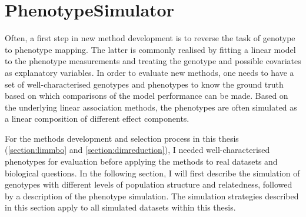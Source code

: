 \chapter{PhenotypeSimulator}
\label{chapter:simulation} 
Often, a first step in new method development is to reverse the task of genotype to phenotype mapping. The latter is commonly realised by fitting a linear model to the phenotype measurements and treating the genotype and possible covariates as explanatory variables. In order to evaluate new methods, one needs to have a set of well-characterised genotypes and phenotypes to know the ground truth based on which comparisons of the model performance can be made. Based on the underlying linear association methods, the phenotypes are often simulated as a linear composition of different effect components. 

For the methods development and selection process in this thesis (\cref{section:limmbo} and \cref{section:dimreduction}), I needed well-characterised phenotypes for evaluation before applying the methods to real datasets and biological questions. In the following section, I will first describe the simulation of genotypes with different levels of population structure and relatedness, followed by a description of the phenotype simulation. The simulation strategies described in this section apply to all simulated datasets within this thesis. 

